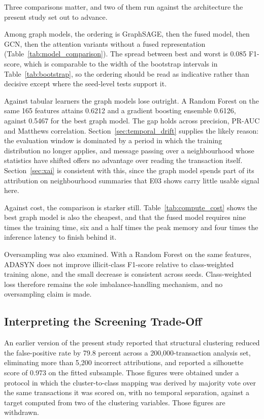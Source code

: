 \documentclass[12pt,a4paper]{article}
\begin{document}
Three comparisons matter, and two of them run against the
architecture the present study set out to advance.

Among graph models, the ordering is GraphSAGE, then the fused
model, then GCN, then the attention variants without a fused
representation (Table~\ref{tab:model_comparison}). The spread
between best and worst is 0.085 F1-score, which is comparable to
the width of the bootstrap intervals in
Table~\ref{tab:bootstrap}, so the ordering should be read as
indicative rather than decisive except where the seed-level tests
support it.

Against tabular learners the graph models lose outright. A Random
Forest on the same 165 features attains 0.6212 and a gradient
boosting ensemble 0.6126, against 0.5467 for the best graph
model. The gap holds across precision, PR-AUC and Matthews
correlation. Section~\ref{sec:temporal_drift} supplies the likely
reason: the evaluation window is dominated by a period in which
the training distribution no longer applies, and message passing
over a neighbourhood whose statistics have shifted offers no
advantage over reading the transaction itself.
Section~\ref{sec:xai} is consistent with this, since the graph
model spends part of its attribution on neighbourhood summaries
that E03 shows carry little usable signal here.

Against cost, the comparison is starker still.
Table~\ref{tab:compute_cost} shows the best graph model is also
the cheapest, and that the fused model requires nine times the
training time, six and a half times the peak memory and four
times the inference latency to finish behind it.

Oversampling was also examined. With a Random Forest on the same
features, ADASYN does not improve illicit-class F1-score relative
to class-weighted training alone, and the small decrease is
consistent across seeds. Class-weighted loss therefore remains
the sole imbalance-handling mechanism, and no oversampling claim
is made.


\subsection{Interpreting the Screening Trade-Off}

An earlier version of the present study reported that structural
clustering reduced the false-positive rate by 79.8 percent across
a 200{,}000-transaction analysis set, eliminating more than 5{,}200
incorrect attributions, and reported a silhouette score of 0.973
on the fitted subsample. Those figures were obtained under a
protocol in which the cluster-to-class mapping was derived by
majority vote over the same transactions it was scored on, with
no temporal separation, against a target computed from two of the
clustering variables. Those figures are withdrawn.
\end{document}
